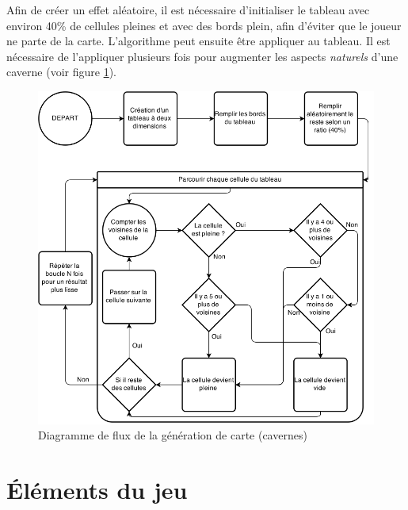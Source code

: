 \documentclass[11pt, a4paper, oneside]{report}
\begin{document}
Afin de créer un effet aléatoire, il est nécessaire d'initialiser le tableau avec environ 40\% de cellules pleines et avec des bords plein, afin d'éviter que le joueur ne parte de la carte. L'algorithme peut ensuite être appliquer au tableau. Il est nécessaire de l'appliquer plusieurs fois pour augmenter les aspects \emph{naturels} d'une caverne (voir figure \ref{fig:mapgeneration}).
\begin{figure}[H]
	\begin{center}
	\includegraphics[width=1\textwidth]{mapgeneration}
	\caption{Diagramme de flux de la génération de carte (cavernes)}
	\label{fig:mapgeneration}
	\end{center}
\end{figure}

\section{Éléments du jeu}
\end{document}
